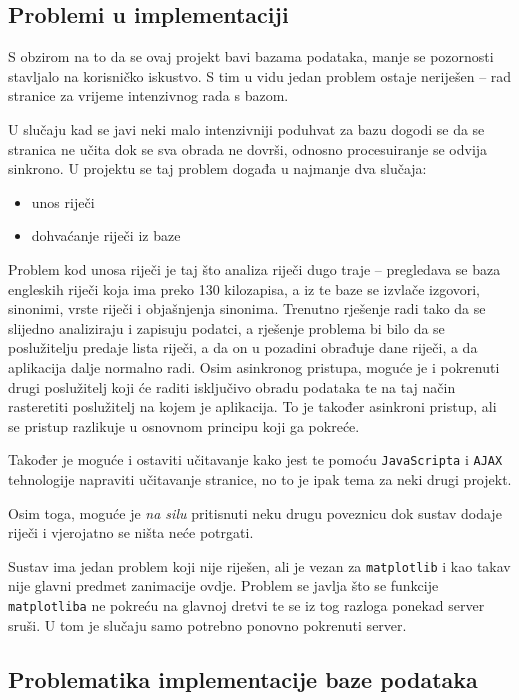 \documentclass{foi}
\begin{document}
\subsection{Problemi u implementaciji}

S obzirom na to da se ovaj projekt bavi bazama podataka, manje se pozornosti
stavljalo na korisničko iskustvo. S tim u vidu jedan problem ostaje neriješen
-- rad stranice za vrijeme intenzivnog rada s bazom.

U slučaju kad se javi neki malo intenzivniji poduhvat za bazu dogodi se da se
stranica ne učita dok se sva obrada ne dovrši, odnosno procesuiranje se odvija
sinkrono. U projektu se taj problem događa u najmanje dva slučaja:
\begin{itemize}
	\item unos riječi
	\item dohvaćanje riječi iz baze
\end{itemize}

Problem kod unosa riječi je taj što analiza riječi dugo traje -- pregledava se
baza engleskih riječi koja ima preko 130 kilozapisa, a iz te baze se izvlače
izgovori, sinonimi, vrste riječi i objašnjenja sinonima. Trenutno rješenje radi
tako da se slijedno analiziraju i zapisuju podatci, a rješenje problema bi bilo
da se poslužitelju predaje lista riječi, a da on u pozadini obrađuje dane
riječi, a da aplikacija dalje normalno radi. Osim asinkronog pristupa, moguće
je i pokrenuti drugi poslužitelj koji će raditi isključivo obradu podataka te na taj
način rasteretiti poslužitelj na kojem je aplikacija. To je također asinkroni
pristup, ali se pristup razlikuje u osnovnom principu koji ga pokreće.

Također je moguće i ostaviti učitavanje kako jest te pomoću
\texttt{JavaScripta} i \texttt{AJAX} tehnologije napraviti učitavanje stranice,
no to je ipak tema za neki drugi projekt.

Osim toga, moguće je \textit{na silu} pritisnuti neku drugu poveznicu dok
sustav dodaje riječi i vjerojatno se ništa neće potrgati.

Sustav ima jedan problem koji nije riješen, ali je vezan za \texttt{matplotlib}
i kao takav nije glavni predmet zanimacije ovdje. Problem se javlja što se
funkcije \texttt{matplotliba} ne pokreću na glavnoj dretvi te se iz tog razloga
ponekad server sruši. U tom je slučaju samo potrebno ponovno pokrenuti server.

\subsection{Problematika implementacije baze podataka}
\end{document}
